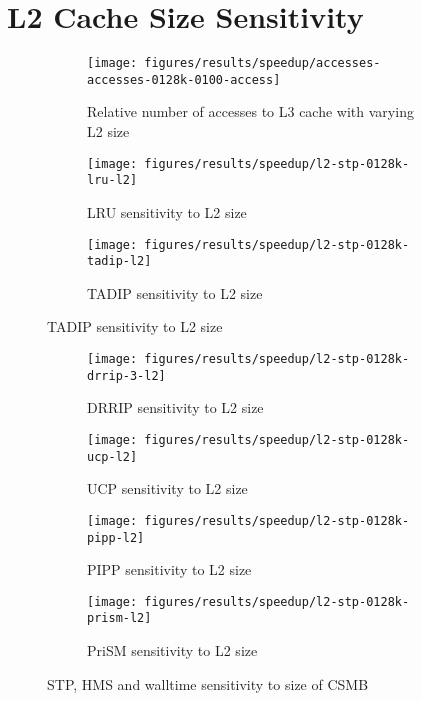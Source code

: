 
\section{L2 Cache Size Sensitivity}
\label{sec:results:l2size_sensitivity}


\begin{figure}[H]
    \centering
    \begin{subfigure}[b]{0.5\textwidth}
	    \texttt{[image: figures/results/speedup/accesses-accesses-0128k-0100-access]}
	    \caption{Relative number of accesses to L3 cache with varying L2 size}
	    \label{fig:results:l2:access}
    \end{subfigure}
    \begin{subfigure}[b]{0.5\textwidth}
        \texttt{[image: figures/results/speedup/l2-stp-0128k-lru-l2]}
        \caption{LRU sensitivity to L2 size}
        \label{fig:results:l2:tadip}
    \end{subfigure}%
    \begin{subfigure}[b]{0.5\textwidth}
        \texttt{[image: figures/results/speedup/l2-stp-0128k-tadip-l2]}
        \caption{TADIP sensitivity to L2 size}
        \label{fig:results:l2:tadip}
    \end{subfigure}
\end{figure}
\clearpage
\begin{figure}[H]
	\ContinuedFloat
    \begin{subfigure}[b]{0.5\textwidth}
        \texttt{[image: figures/results/speedup/l2-stp-0128k-drrip-3-l2]}
        \caption{DRRIP sensitivity to L2 size}
        \label{fig:results:l2:drrip}
    \end{subfigure}%
    \begin{subfigure}[b]{0.5\textwidth}
        \texttt{[image: figures/results/speedup/l2-stp-0128k-ucp-l2]}
        \caption{UCP sensitivity to L2 size}
        \label{fig:results:l2:ucp}
    \end{subfigure}
    \begin{subfigure}[b]{0.5\textwidth}
        \texttt{[image: figures/results/speedup/l2-stp-0128k-pipp-l2]}
        \caption{PIPP sensitivity to L2 size}
        \label{fig:results:l2:pipp}
    \end{subfigure}%
    \begin{subfigure}[b]{0.5\textwidth}
        \texttt{[image: figures/results/speedup/l2-stp-0128k-prism-l2]}
        \caption{PriSM sensitivity to L2 size}
        \label{fig:results:l2:prism}
    \end{subfigure}
    \caption{STP, HMS and walltime sensitivity to size of CSMB}
    \label{fig:results:l2}
\end{figure}